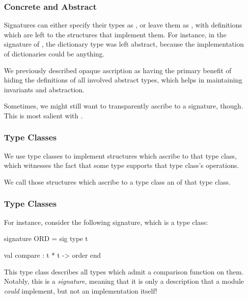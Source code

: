 \documentclass[aspectratio=169, handout]{beamer}
\begin{document}


\begin{frame}[fragile]
  \frametitle{Concrete and Abstract}

  Signatures can either specify their types as , or leave
  them as , with definitions which are left to the
  structures that implement them. For instance, in the signature of
  , the dictionary type  was left abstract,
  because the implementation of dictionaries could be anything.

  \pause
  \vspace{\fill}

  We previously described opaque ascription as having the primary benefit of
  hiding the definitions of all involved abstract types, which helps in
  maintaining invariants and abstraction.

  \pause
  \vspace{\fill}

  Sometimes, we might still want to transparently ascribe to a signature, though.
  This is most salient with .
\end{frame}

\begin{frame}[fragile]
  \frametitle{Type Classes}


  \pause
  \vspace{\fill}

  We use type classes to implement structures which ascribe to that type class,
  which witnesses the fact that some type supports that type class's operations.

  \pause
  \vspace{\fill}

  We call those structures which ascribe to a type class an  of
  that type class.
\end{frame}

\begin{frame}[fragile]
  \frametitle{Type Classes}
  For instance, consider the following signature, which is a type class:
  \begin{codeblock}
    signature ORD =
      sig
        type t

        val compare : t * t -> order
      end
  \end{codeblock}

  \pause
  \vspace{\fill}

  This type class describes all types which admit a comparison function on them.
  Notably, this is a \textit{signature}, meaning that it is only a description
  that a module \textit{could} implement, but not an implementation itself!
\end{frame}
\end{document}
